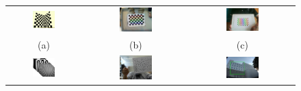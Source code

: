 \documentclass{report}
\begin{document}
\begin{savenotes}
\setlength{\tabcolsep}{2pt}
\begin{figure}
\centering
\begin{tabular}{ccc}
\includegraphics[width=0.33\textwidth]{images/calibpatt/calib-cube.eps} &
\includegraphics[width=0.33\textwidth]{images/calibpatt/calib-chessboard.eps} & 
\includegraphics[trim=0.3in 0in 0.2in 0in, clip=true, width=0.33\textwidth]{images/calibpatt/calib-dot.eps} \\
(a) & (b) & (c)\\
\includegraphics[width=0.33\textwidth]{images/calibpatt/calib-temporal.eps} &
\includegraphics[width=0.33\textwidth]{images/calibpatt/calib-randot.eps} & 
\includegraphics[trim=0.3in 0in 0.2in 0in, clip=true, width=0.33\textwidth]{images/calibpatt/calib-rank.eps} \\

\end{tabular}
\end{figure}
\end{savenotes}
\end{document}
